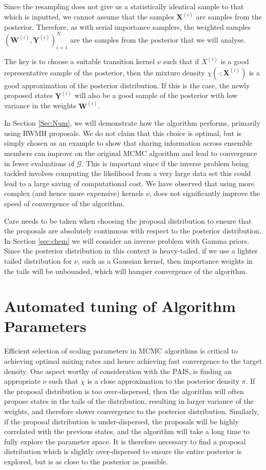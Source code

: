 \documentclass[final]{siamltex}
\newcommand{\G}{\mathcal{G}}
\newcommand{\X}{{\mathbf X}}
\newcommand{\Y}{{\mathbf Y}}
\newcommand{\W}{{\mathbf W}}
\begin{document}
Since the resampling does not give us a statistically identical sample
to that which is inputted, we cannot assume that the samples $\X^{(i)}$
are samples from the posterior. Therefore, as with serial
importance samplers, the weighted samples
$(\W^{(i)},\Y^{(i)})_{i=1}^N$ are the samples from the posterior that
we will analyse.

The key is to choose a suitable transition kernel $\nu$ such that
if $X^{(i)}$ is a good representative sample of the posterior,
then the mixture density $\chi(\cdot;\X^{(i)})$ is a good
approximation of the posterior distribution. If this is the case,
the newly proposed states $\Y^{(i)}$ will also be a good sample of the posterior with low variance in the
weights $\W^{(i)}$.

In Section \ref{Sec:Num}, we will demonstrate how the algorithm
performs, primarily using RWMH proposals. We do not claim that this choice is optimal, but
is simply chosen as an example to show that sharing information across
ensemble members can improve on the original MCMC algorithm and lead to
convergence in fewer evaluations of $\G$. This is important since if
the inverse problem being tackled involves computing
the likelihood from a very large data set this could lead to a
large saving of computational cost. We have observed that
using more complex (and hence more expensive) kernels $\nu$, does not
significantly improve the speed of convergence of the algorithm.

Care needs to be taken when choosing the proposal distribution to
ensure that the proposals are absolutely continuous with respect to
the posterior distribution. In Section \ref{sec:chem} we will consider
an inverse problem with Gamma priors. Since the posterior distribution
in this context is heavy-tailed, if we use a lighter tailed
distribution for $\nu$, such as a Gaussian kernel, then importance
weights in the tails will be unbounded, which will hamper convergence
of the algorithm.

\section{Automated tuning of Algorithm Parameters}\label{Sec:adapt}

Efficient selection of scaling parameters in MCMC algorithms is
critical to achieving optimal mixing rates and hence achieving fast
convergence to the target density. One aspect worthy of  consideration
with the PAIS, is finding an appropriate $\nu$ such that
$\chi$ is a close approximation to the posterior density $\pi$. If the
proposal distribution is too over-dispersed, then the algorithm will often
propose states in the tails of the distribution, resulting in larger
variance of the weights, and therefore slower convergence to the
posterior distribution. Similarly, if the proposal distribution is
under-dispersed, the proposals will be highly correlated with the
previous states, and the algorithm will take a long time to fully explore
the parameter space. It is therefore necessary to find a proposal
distribution which is slightly over-dispersed to ensure the entire
posterior is explored\cite{gelman1992inference}, but is as close to the
posterior as possible.
\end{document}
